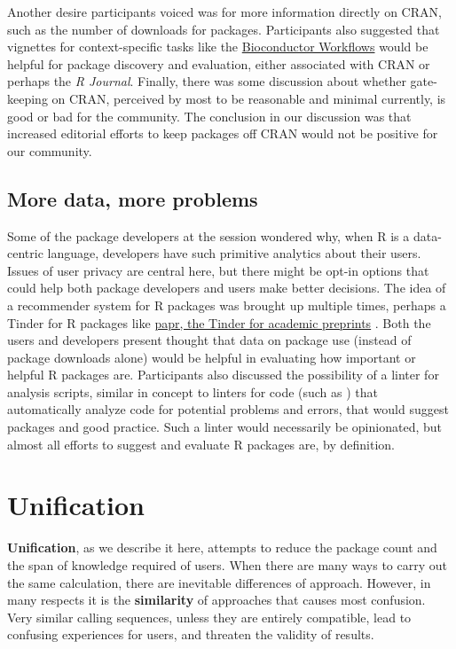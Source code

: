 Another desire participants voiced was for more information directly on
CRAN, such as the number of downloads for packages. Participants also
suggested that vignettes for context-specific tasks like the
\href{https://www.bioconductor.org/packages/release/workflows/}{Bioconductor
Workflows} \citep{bioc} would be helpful for package discovery and
evaluation, either associated with CRAN or perhaps the \emph{R Journal}.
Finally, there was some discussion about whether gate-keeping on CRAN,
perceived by most to be reasonable and minimal currently, is good or bad
for the community. The conclusion in our discussion was that increased
editorial efforts to keep packages off CRAN would not be positive for
our community.

\hypertarget{more-data-more-problems}{%
\subsection{More data, more problems}\label{more-data-more-problems}}

Some of the package developers at the session wondered why, when R is a
data-centric language, developers have such primitive analytics about
their users. Issues of user privacy are central here, but there might be
opt-in options that could help both package developers and users make
better decisions. The idea of a recommender system for R packages was
brought up multiple times, perhaps a Tinder for R packages like
\href{https://simplystatistics.org/2016/10/03/papr/}{papr, the Tinder
for academic preprints} \citep{papr}. Both the users and developers
present thought that data on package use (instead of package downloads
alone) would be helpful in evaluating how important or helpful R
packages are. Participants also discussed the possibility of a linter
for analysis scripts, similar in concept to linters for code (such as
\citet{lintr}) that automatically analyze code for potential problems
and errors, that would suggest packages and good practice. Such a linter
would necessarily be opinionated, but almost all efforts to suggest and
evaluate R packages are, by definition.

\hypertarget{unification}{%
\section{Unification}\label{unification}}

\textbf{Unification}, as we describe it here, attempts to reduce the
package count and the span of knowledge required of users. When there
are many ways to carry out the same calculation, there are inevitable
differences of approach. However, in many respects it is the
\textbf{similarity} of approaches that causes most confusion. Very
similar calling sequences, unless they are entirely compatible, lead to
confusing experiences for users, and threaten the validity of results.

